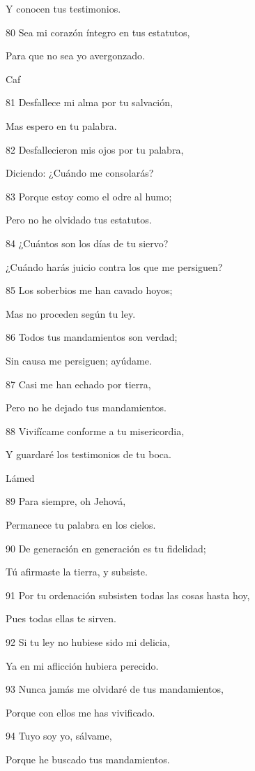 \par Y conocen tus testimonios.
\par 80 Sea mi corazón íntegro en tus estatutos,
\par Para que no sea yo avergonzado.
\par Caf
\par 81 Desfallece mi alma por tu salvación,
\par Mas espero en tu palabra.
\par 82 Desfallecieron mis ojos por tu palabra,
\par Diciendo: ¿Cuándo me consolarás?
\par 83 Porque estoy como el odre al humo;
\par Pero no he olvidado tus estatutos.
\par 84 ¿Cuántos son los días de tu siervo?
\par ¿Cuándo harás juicio contra los que me persiguen?
\par 85 Los soberbios me han cavado hoyos;
\par Mas no proceden según tu ley.
\par 86 Todos tus mandamientos son verdad;
\par Sin causa me persiguen; ayúdame.
\par 87 Casi me han echado por tierra,
\par Pero no he dejado tus mandamientos.
\par 88 Vivifícame conforme a tu misericordia,
\par Y guardaré los testimonios de tu boca.
\par Lámed
\par 89 Para siempre, oh Jehová,
\par Permanece tu palabra en los cielos.
\par 90 De generación en generación es tu fidelidad;
\par Tú afirmaste la tierra, y subsiste.
\par 91 Por tu ordenación subsisten todas las cosas hasta hoy,
\par Pues todas ellas te sirven.
\par 92 Si tu ley no hubiese sido mi delicia,
\par Ya en mi aflicción hubiera perecido.
\par 93 Nunca jamás me olvidaré de tus mandamientos,
\par Porque con ellos me has vivificado.
\par 94 Tuyo soy yo, sálvame,
\par Porque he buscado tus mandamientos.
